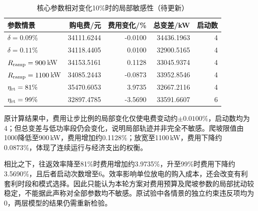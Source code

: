 \documentclass[withoutpreface,bwprint]{cumcmthesis}
\begin{document}
\begin{table}[H]
 \centering\small
 \caption{核心参数相对变化10\%时的局部敏感性（待更新）}\label{tab:q1-robust}
 \begin{tabular}{lrrrr}
 \toprule
 参数情景&购电费/元&费用变化/\%&总变差/kW&启动数\\
 \midrule
$\delta=0.09\%$&34111.6244&-0.0100&34436.1963&4\\
$\delta=0.11\%$&34118.4405&0.0100&32900.5165&4\\
$R_{\rm ramp}=900$\,kW&34153.5161&0.1128&33045.9374&4\\
$R_{\rm ramp}=1100$\,kW&34085.2443&-0.0873&33952.8546&4\\
$\eta_{\rm rt}=81\%$&35470.6053&3.9735&32667.2116&4\\
$\eta_{\rm rt}=99\%$&32897.4785&-3.5690&33591.6607&6\\
 \bottomrule
 \end{tabular}
\end{table}

原计算结果中，费用让步比例的局部变化仅使电费变动约$\pm0.0100\%$，启动数均为4；但总变差与低功率段仍会变化，说明局部轨迹并非完全不敏感。爬坡限值由1000降低至900\,kW，费用增加约0.1128\%；放宽至1100\,kW，费用下降约0.0873\%，体现了连续运行与经济支出的权衡。

相比之下，往返效率降至81\%时费用增加约3.9735\%，升至99\%时费用下降约3.5690\%，且后者启动次数增至6。效率影响单位放电的购入成本，还会改变有利套利时段和模式选择。因此只能认为本轮方案对费用预算及爬坡参数的局部扰动较稳定，不能据此声称对全部参数均不敏感。原试验中各情景的独立约束违反项均为0，两层模型的结果仍需重新检验。
\end{document}
